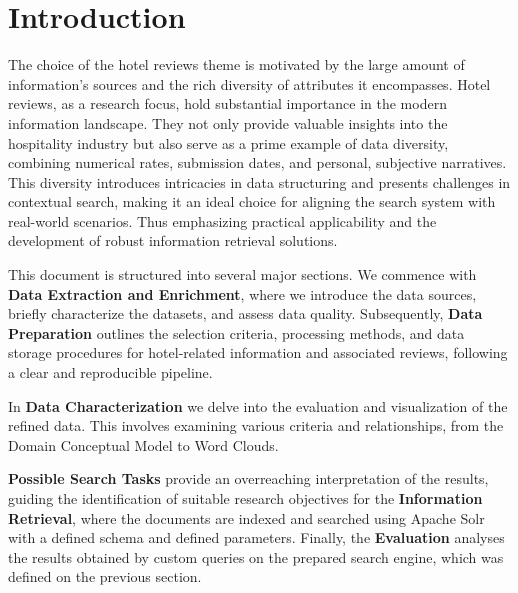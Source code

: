 \documentclass[sigconf]{acmart}
\begin{document}




\maketitle

\section{Introduction}


The choice of the hotel reviews theme is motivated by the large amount of information's sources and the rich diversity of attributes it encompasses. Hotel reviews, as a research focus, hold substantial importance in the modern information landscape. They not only provide valuable insights into the hospitality industry but also serve as a prime example of data diversity, combining numerical rates, submission dates, and personal, subjective narratives. This diversity introduces intricacies in data structuring and presents challenges in contextual search, making it an ideal choice for aligning the search system with real-world scenarios. Thus emphasizing practical applicability and the development of robust information retrieval solutions.

This document is structured into several major sections. We commence with \textbf{Data Extraction and Enrichment}, where we introduce the data sources, briefly characterize the datasets, and assess data quality. Subsequently, \textbf{Data Preparation} outlines the selection criteria, processing methods, and data storage procedures for hotel-related information and associated reviews, following a clear and reproducible pipeline.

In \textbf{Data Characterization} we delve into the evaluation and visualization of the refined data. This involves examining various criteria and relationships, from the Domain Conceptual Model to Word Clouds.

\textbf{Possible Search Tasks} provide an overreaching interpretation of the results, guiding the identification of suitable research objectives for the \textbf{Information Retrieval}, where the documents are indexed and searched using Apache Solr with a defined schema and defined parameters. Finally, the \textbf{Evaluation} analyses the results obtained by custom queries on the prepared search engine, which was defined on the previous section.
\end{document}
